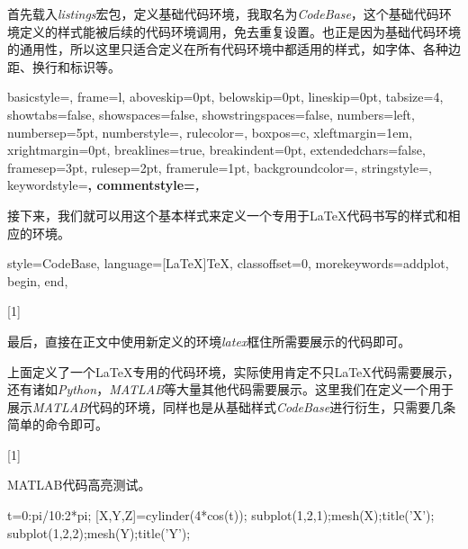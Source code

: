 首先载入\emph{listings}宏包，定义基础代码环境，我取名为\emph{CodeBase}，这个基础代码环境定义的样式能被后续的代码环境调用，免去重复设置。也正是因为基础代码环境的通用性，所以这里只适合定义在所有代码环境中都适用的样式，如字体、各种边距、换行和标识等。

\begin{latex}
{
	basicstyle=\small\ttfamily,
	frame=l,
	aboveskip=0pt,%
	belowskip=0pt,%
	lineskip=0pt,
	tabsize=4,%
	showtabs=false,%
	showspaces=false,%
	showstringspaces=false,
	numbers=left,
	numbersep=5pt,%
	numberstyle=\small\ttfamily,
	rulecolor=\color{cyan},
	boxpos=c,
	xleftmargin=1em,%
	xrightmargin=0pt,
	breaklines=true,%
	breakindent=0pt,%
	extendedchars=false,%
	framesep=3pt,
	rulesep=2pt,
	framerule=1pt,
	backgroundcolor=\color{gray!5},
	stringstyle=\color{green!40!black!100},
	keywordstyle=\bfseries\color[RGB]{0,0,255},
	commentstyle=\slshape\color{black!60},
}
\end{latex}

接下来，我们就可以用这个基本样式来定义一个专用于\LaTeX 代码书写的样式和相应的环境。

\begin{latex}
{
	style=CodeBase,
	language=[LaTeX]TeX,
	classoffset=0,
	morekeywords={addplot, begin, end},
}

[1]{\lstset{style=LaTeX}}{}
\end{latex}

最后，直接在正文中使用新定义的环境\emph{latex}框住所需要展示的代码即可。

上面定义了一个\LaTeX 专用的代码环境，实际使用肯定不只\LaTeX 代码需要展示，还有诸如\emph{Python}，\emph{MATLAB}等大量其他代码需要展示。这里我们在定义一个用于展示\emph{MATLAB}代码的环境，同样也是从基础样式\emph{CodeBase}进行衍生，只需要几条简单的命令即可。

\begin{latex}

[1]{\lstset{style=Matlab}}{}
\end{latex}

MATLAB代码高亮测试。

\begin{Matlab}{}
t=0:pi/10:2*pi;
[X,Y,Z]=cylinder(4*cos(t));
subplot(1,2,1);mesh(X);title('X');
subplot(1,2,2);mesh(Y);title('Y');
\end{Matlab}

